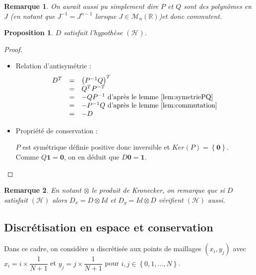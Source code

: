 \documentclass[10pt,a4paper]{article}
\newtheorem{proposition}{Proposition}
\newtheorem{remarque}{Remarque}
\begin{document}
\begin{remarque}
On aurait aussi pu simplement dire $P$ et $Q$ sont des polynômes en $J$ (en notant que $J^{-1} = J^{n-1}$ lorsque $J \in \mathcal{M}_n\left( \mathbb{R}\right)$)et donc commutent.
\end{remarque}

\begin{proposition}
$D$ satisfait l'hypothèse $(\mathcal{H})$.
\end{proposition}

\begin{proof}
\begin{itemize}
\item Relation d'antisymétrie :
$$
\begin{array}{rcl}
D^T                     & = & \left( P^{-1}Q \right)^T\\
						& = & Q^T P^{-T}\\
                         & = & -Q P^{-1} \text{  d'après le lemme \ref{lem:symetriePQ}} \\
                         & = & -P^{-1} Q \text{  d'après le lemme \ref{lem:commutation}}\\
                         & = & -D 
\end{array}
$$

\item Propriété de conservation :

$P$ est symétrique définie positive donc inversible et $Ker(P) = \left\lbrace \mathbf{0} \right\rbrace$.
Comme $Q \mathbf{1} = \mathbf{0}$, on en déduit que $D \mathbf{0} = \mathbf{1}$.
\end{itemize} 
\end{proof}

\begin{remarque}
En notant $\otimes$ le produit de Kronecker, on remarque que si $D$ satisfait $(\mathcal{H})$ alors $D_x=D \otimes Id$ et $D_y=Id \otimes D$ vérifient $(\mathcal{H})$ aussi.
\end{remarque}

\subsection{Discrétisation en espace et conservation}

Dans ce cadre, on considère $u$ discrétisée aux points de maillages $(x_i,y_j)$ avec $x_i=i \times \dfrac{1}{N+1}$ et $y_j = j \times \dfrac{1}{N+1}$ pour $i,j \in \left\lbrace 0, 1, ..., N \right\rbrace$.
\end{document}
